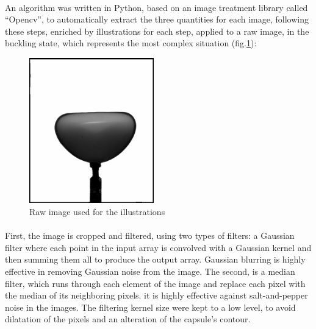 \paragraph{}
An algorithm was written in Python, based on an image treatment library called "`Opencv"', to automatically extract the three quantities for each image, following these steps, enriched by illustrations for each step, applied to a raw image, in the buckling state, which represents the most complex  situation (fig.\ref{fig:raw_image}):
\begin{figure}[H] %
	\centering%
  \includegraphics[width=0.48\textwidth]{figures/Chapter_1/raw_image.png}
	\caption{Raw image used for the illustrations}
	\label{fig:raw_image}
\end{figure}
\paragraph{}
First, the image is cropped and filtered, using two types of filters: a Gaussian filter where each point in the input array is convolved with a Gaussian kernel and then summing them all to produce the output array. Gaussian blurring is highly effective in removing Gaussian noise from the image. The second, is a median filter, which runs through each element of the image and replace each pixel with the median of its neighboring pixels. it is highly effective against salt-and-pepper noise in the images.
The filtering kernel size were kept to a low level, to avoid dilatation of the pixels and an alteration of the capsule's contour.

